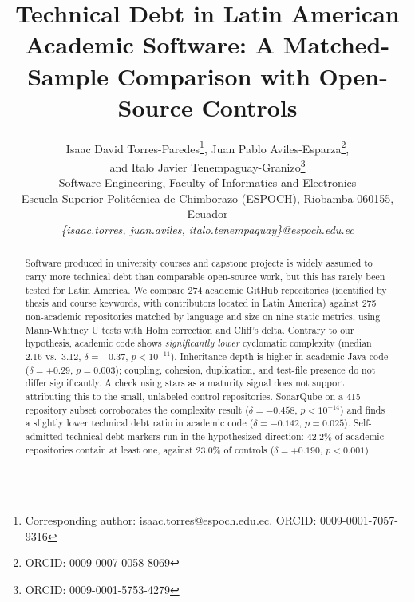\documentclass{cleiej}
\title{Technical Debt in Latin American Academic Software: A Matched-Sample Comparison with Open-Source Controls}
\author{
Isaac David Torres-Paredes\footnote{Corresponding author: isaac.torres@espoch.edu.ec. ORCID: 0009-0001-7057-9316}, Juan Pablo Aviles-Esparza\footnote{ORCID: 0009-0007-0058-8069}, \\ and Italo Javier Tenempaguay-Granizo\footnote{ORCID: 0009-0001-5753-4279} \\
Software Engineering, Faculty of Informatics and Electronics \\
Escuela Superior Polit\'ecnica de Chimborazo (ESPOCH), Riobamba 060155, Ecuador \\
\it \{isaac.torres, juan.aviles, italo.tenempaguay\}@espoch.edu.ec
}
\begin{document}
\maketitle
\sloppy

\begin{abstract}
\noindent Software produced in university courses and capstone projects is widely assumed to carry more technical debt than comparable open-source work, but this has rarely been tested for Latin America. We compare 274 academic GitHub repositories (identified by thesis and course keywords, with contributors located in Latin America) against 275 non-academic repositories matched by language and size on nine static metrics, using Mann-Whitney U tests with Holm correction and Cliff's delta. Contrary to our hypothesis, academic code shows \emph{significantly lower} cyclomatic complexity (median 2.16 vs.\ 3.12, $\delta=-0.37$, $p<10^{-11}$). Inheritance depth is higher in academic Java code ($\delta=+0.29$, $p=0.003$); coupling, cohesion, duplication, and test-file presence do not differ significantly. A check using stars as a maturity signal does not support attributing this to the small, unlabeled control repositories. SonarQube on a 415-repository subset corroborates the complexity result ($\delta=-0.458$, $p<10^{-14}$) and finds a slightly lower technical debt ratio in academic code ($\delta=-0.142$, $p=0.025$). Self-admitted technical debt markers run in the hypothesized direction: 42.2\% of academic repositories contain at least one, against 23.0\% of controls ($\delta=+0.190$, $p<0.001$).
\end{abstract}

\end{document}
